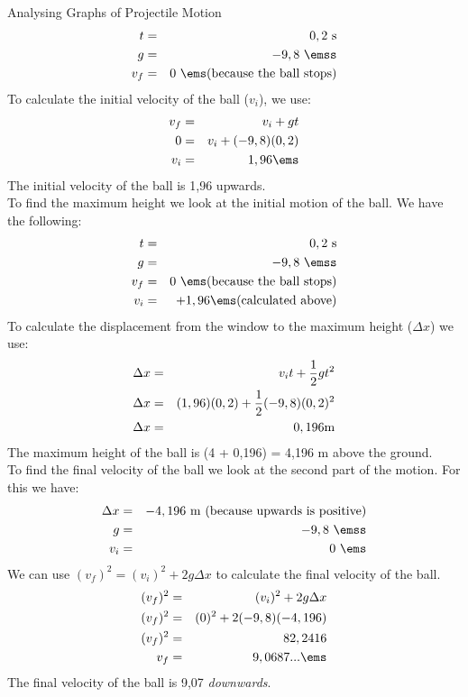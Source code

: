 \begin{wex}{Analysing Graphs of Projectile Motion}
{\begin{eqnarray*}
t &=& 0,2~\rm{s}\\
g &=& -9,8~\emss\\
v_f &=& 0~\ems \rm{(because~the~ball~stops)}
\end{eqnarray*}
To calculate the initial velocity of the ball ($v_i$), we use:
\begin{eqnarray*}
v_f &=& v_i + gt\\
0 &=& v_i + (-9,8)(0,2)\\
v_i &=& 1,96 \ems
\end{eqnarray*}
The initial velocity of the ball is 1,96 \ms upwards.\\

To find the maximum height we look at the initial motion of the ball. We have the following:
\begin{eqnarray*}
t &=& 0,2~\rm{s}\\
g &=& -9,8~\emss\\
v_f &=& 0~\ems \rm{(because~the~ball~stops)}\\
v_i &=& +1,96 \ems \rm{(calculated~above)}
\end{eqnarray*}
To calculate the displacement from the window to the maximum height ($\Delta x$) we use:
\begin{eqnarray*}
\Delta x &=& v_it + \frac{1}{2}gt^2\\
\Delta x &=& (1,96)(0,2) + \frac{1}{2}(-9,8)(0,2)^2\\
\Delta x &=& 0,196 \rm{m}\\
\end{eqnarray*}
The maximum height of the ball is (4 + 0,196) = 4,196 m above the ground.\\

To find the final velocity of the ball we look at the second part of the motion. For this we have:
\begin{eqnarray*}
\Delta x &=& -4,196~\rm{m} \rm~({because~upwards~is~positive})\\
g &=& -9,8~\emss\\
v_i &=& 0~\ems
\end{eqnarray*}
We can use $(v_f)^2 = (v_i)^2 + 2g\Delta x$ to calculate the final velocity of the ball.
\begin{eqnarray*}
(v_f)^2 &=& (v_i)^2 + 2g\Delta x\\
(v_f)^2 &=& (0)^2 + 2(-9,8)(-4,196)\\
(v_f)^2 &=& 82,2416\\
v_f &=& 9,0687 ... \ems\\
\end{eqnarray*}
The final velocity of the ball is 9,07 \ms \textit{downwards}.
}
\end{wex}


